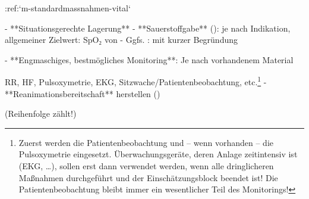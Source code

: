 :ref:`m-standardmassnahmen-vital`%
\label{topic:standardmassnahmen-vital}%
\label{proc:YY13100B}%
\begin{enumerate}
  -   **Situationsgerechte Lagerung**
  -   **Sauerstoffgabe**
  (): je nach Indikation,
  allgemeiner Zielwert: SpO₂ von %
  -   Ggfs.  :
  mit kurzer Begründung
  
  -   **Engmaschiges, bestmögliches Monitoring**: Je nach
  vorhandenem Material
  
  RR, HF, Pulsoxymetrie, EKG,
  Sitzwache/Patientenbeobachtung, etc.\footnote{Zuerst werden die Patientenbeobachtung
  und -- wenn vorhanden -- die
  Pulsoxymetrie eingesetzt. Überwachungsgeräte, deren Anlage
  zeitintensiv ist (EKG, \ldots), sollen erst dann verwendet
  werden, wenn alle dringlicheren Maßnahmen durchgeführt und
  der Einschätzungsblock beendet ist! Die
  Patientenbeobachtung bleibt immer ein wesentlicher Teil
  des Monitorings!}
  -   **Reanimationsbereitschaft** herstellen
  ()
\end{enumerate}

{\scriptsize(Reihenfolge zählt!)}